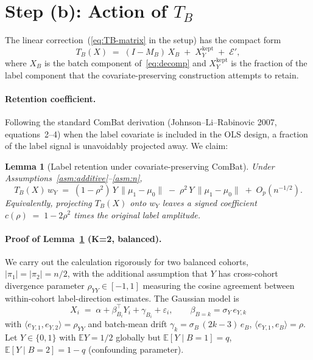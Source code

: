 \documentclass[11pt,a4paper]{article}
\newtheorem{lemma}[theorem]{Lemma}
\newcommand{\E}{\mathbb{E}}
\begin{document}
\section{Step (b): Action of $T_B$}

The linear correction~(\ref{eq:TB-matrix} in the setup) has the compact
form
\begin{equation}
  T_B(X) \;=\; (I-M_B)\,X_{\!B} \;+\; X_{\!Y}^{\text{kept}} \;+\; \mathcal{E}',
  \label{eq:TB-recap}
\end{equation}
where $X_B$ is the batch component of~\eqref{eq:decomp} and
$X_Y^{\text{kept}}$ is the fraction of the label component that the
covariate-preserving construction attempts to retain.

\paragraph{Retention coefficient.} Following the standard ComBat
derivation (Johnson--Li--Rabinovic 2007, equations~2--4) when the
label covariate is included in the OLS design, a fraction of the label
signal is unavoidably projected away. We claim:
\begin{lemma}[Label retention under covariate-preserving ComBat]
\label{lem:retention}
Under Assumptions~\ref{asm:additive}--\ref{asm:n},
\begin{equation}
   T_B(X)\, w_Y \;=\; (1-\rho^{2})\,Y\,\lVert\mu_1-\mu_0\rVert
   \;-\;\rho^{2}\,Y\,\lVert\mu_1-\mu_0\rVert \;+\; O_{\!p}(n^{-1/2}).
   \label{eq:retention}
\end{equation}
Equivalently, projecting $T_B(X)$ onto $w_Y$ leaves a signed coefficient
\(
  c(\rho) \;=\; 1-2\rho^{2}
\)
times the original label amplitude.
\end{lemma}

\paragraph{Proof of Lemma~\ref{lem:retention} (K=2, balanced).}
We carry out the calculation rigorously for two balanced cohorts,
$|\pi_1|=|\pi_2|=n/2$, with the additional assumption that $Y$ has
cross-cohort divergence parameter $\rho_{YY}\in[-1,1]$ measuring the
cosine agreement between within-cohort label-direction estimates. The
Gaussian model is
\begin{equation}
   X_i \;=\; \alpha + \beta_{B_i}^{\!\top} Y_i + \gamma_{B_i} + \varepsilon_i,
   \qquad \beta_{B=k} = \sigma_Y \, e_{Y,k}
   \label{eq:model-plat}
\end{equation}
with $\langle e_{Y,1}, e_{Y,2}\rangle = \rho_{YY}$ and batch-mean
drift $\gamma_k = \sigma_B\,(2k{-}3)\,e_B$, $\langle e_{Y,1},e_B\rangle=\rho$.
Let $Y\in\{0,1\}$ with $\E Y=1/2$ globally but $\E[Y\mid B=1]=q$,
$\E[Y\mid B=2]=1-q$ (confounding parameter).
\end{document}
